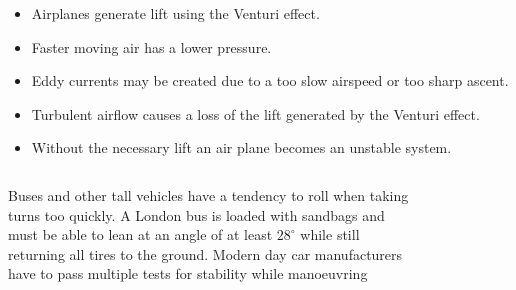\begin{frame}
	\begin{itemize}
		\item Airplanes generate lift using the Venturi effect.
		\item Faster moving air has a lower pressure.
		\item Eddy currents may be created due to a too slow airspeed or too sharp ascent.
		\item Turbulent airflow causes a loss of the lift generated by the Venturi effect.
		\item Without the necessary lift an air plane becomes an unstable system.
	\end{itemize}
\end{frame}
\begin{frame}
	\begin{columns}
		\begin{column}{0.6\textwidth}
			Buses and other tall vehicles have a tendency to roll when taking turns too quickly.
			A London bus is loaded with sandbags and must be able to lean  at an angle of at least $28^{\circ}$ while still returning all tires to the ground.
			Modern day car manufacturers have to pass multiple tests for stability while manoeuvring
		\end{column}
		\begin{column}{0.4\textwidth}
			\begin{figure}
				\centering
				\includegraphics[width=0.8\linewidth]{Images/discrete_time_systems_32}
				\label{fig:discrete_time_systems_32}
			\end{figure}
		\end{column}
	\end{columns}
\end{frame}
